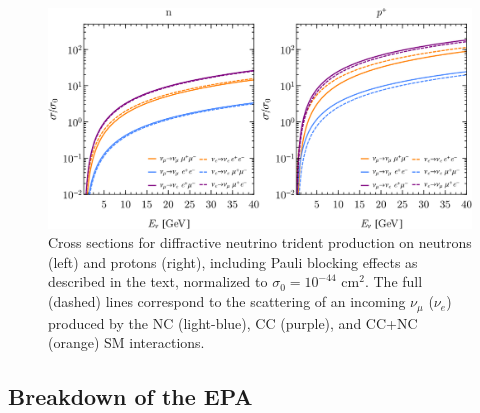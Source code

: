\begin{figure}[t]
\centering\includegraphics[width=\textwidth]{figs/Xsec_4PS_diff.pdf}
\caption[Diffractive neutrino trident production total cross sections.]{Cross sections for diffractive neutrino trident production on neutrons (left) and protons (right), including Pauli blocking effects as described in the text, normalized to $\sigma_0 =  10^{-44}$ cm$^2$. The full (dashed) lines correspond to the scattering of an incoming $\nu_\mu$ ($\nu_e$) produced by the NC (light-blue), CC (purple), and CC+NC (orange) SM interactions. \label{fig:dif_xsec}}
\end{figure}


\subsection{Breakdown of the EPA \label{sec:EPAbreakdown}}

